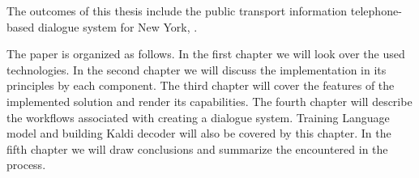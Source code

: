 The outcomes of this thesis include the public transport information telephone-based dialogue system for New York, .

The paper is organized as follows.
In the first chapter we will look over the used technologies.
In the second chapter we will discuss the implementation in its principles by each component. %
The third chapter will cover the features of the implemented solution and render its capabilities.
The fourth chapter will describe the workflows associated with creating a dialogue system.
Training Language model and building Kaldi decoder will also be covered by this chapter.
In the fifth chapter we will draw conclusions and summarize the  encountered in the process.
















